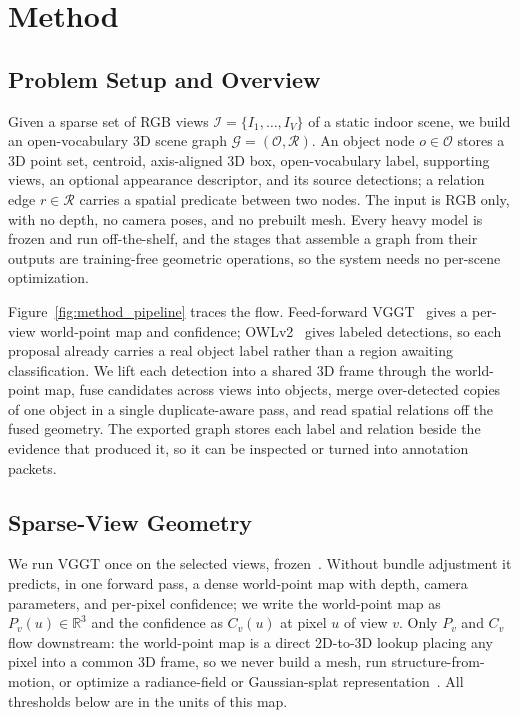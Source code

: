 \section{Method}
\label{sec:method}

\subsection{Problem Setup and Overview}
\label{sec:setup}

Given a sparse set of RGB views $\mathcal{I}=\{I_1,\dots,I_V\}$ of a static indoor scene, we build an
open-vocabulary 3D scene graph $\mathcal{G}=(\mathcal{O},\mathcal{R})$. An object node
$o\in\mathcal{O}$ stores a 3D point set, centroid, axis-aligned 3D box, open-vocabulary label, supporting
views, an optional appearance descriptor, and its source detections; a relation edge $r\in\mathcal{R}$
carries a spatial predicate between two nodes. The input is RGB only, with no depth, no camera poses, and
no prebuilt mesh. Every heavy model is frozen and run off-the-shelf, and the stages that assemble a graph
from their outputs are training-free geometric operations, so the system needs no per-scene optimization.

Figure~\ref{fig:method_pipeline} traces the flow. Feed-forward VGGT~\cite{wang2025vggt} gives a per-view
world-point map and confidence; OWLv2~\cite{minderer2023owlv2} gives labeled detections, so each proposal
already carries a real object label rather than a region awaiting classification. We lift each detection
into a shared 3D frame through the world-point map, fuse candidates across views into objects, merge
over-detected copies of one object in a single duplicate-aware pass, and read spatial relations off the
fused geometry. The exported graph stores each label and relation beside the evidence that produced it,
so it can be inspected or turned into annotation packets.



\subsection{Sparse-View Geometry}
\label{sec:geometry}

We run VGGT once on the selected views, frozen~\cite{wang2025vggt}. Without bundle adjustment it
predicts, in one forward pass, a dense world-point map with depth, camera parameters, and per-pixel
confidence; we write the world-point map as $P_v(u)\in\mathbb{R}^3$ and the confidence as $C_v(u)$ at
pixel $u$ of view $v$. Only $P_v$ and $C_v$ flow downstream: the world-point map is a direct 2D-to-3D
lookup placing any pixel into a common 3D frame, so we never build a mesh, run structure-from-motion, or
optimize a radiance-field or Gaussian-splat
representation~\cite{schonberger2016sfm,mildenhall2020nerf,kerbl2023gaussian}. All thresholds below are in
the units of this map.

